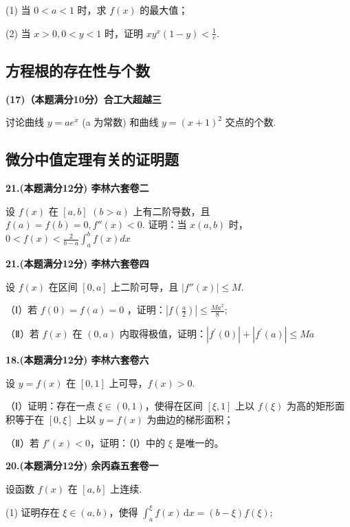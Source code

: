 \documentclass[a4paper,12pt]{article}
\begin{document}
(1) 当 $0 < a < 1$ 时，求 $f(x)$ 的最大值；

(2) 当 $x > 0, 0 < y < 1$ 时，证明 $xy^{x}(1 - y) < \frac{1}{e}$.

\subsection{方程根的存在性与个数}

\textbf{(17)（本题满分10分）合工大超越三}

讨论曲线 $y = a e^{x}$ (a 为常数) 和曲线 $y = (x + 1)^{2}$ 交点的个数.

\subsection{微分中值定理有关的证明题}

\textbf{21.(本题满分12分) 李林六套卷二}

设 $f(x)$ 在 $[a,b]$ $(b>a)$ 上有二阶导数，且 $f(a)=f(b)=0, f''(x)<0.$ 证明：当 $x(a,b)$ 时，$0<f(x)<\frac{2}{b-a}\int_{a}^{b}f(x)dx$

\vspace{0.5cm}

\textbf{21.(本题满分12分) 李林六套卷四}

设 $f(x)$ 在区间 $[0,a]$ 上二阶可导，且 $\left|f''(x)\right| \leqslant M.$

（Ⅰ）若 $f(0)=f(a)=0$ ，证明：$\left|f\left(\frac{a}{2}\right)\right|\leqslant\frac{Ma^{2}}{8}$;

（Ⅱ）若 $f(x)$ 在 $(0,a)$ 内取得极值，证明：$\left|f^{\prime}(0)\right|+\left|f^{\prime}(a)\right|\leqslant Ma$

\vspace{0.5cm}

\textbf{18.(本题满分12分) 李林六套卷六}

设 $y = f(x)$ 在 $[0,1]$ 上可导，$f(x) > 0$.

（Ⅰ）证明：存在一点 $\xi \in (0,1)$，使得在区间 $[\xi,1]$ 上以 $f(\xi)$ 为高的矩形面积等于在 $[0, \xi]$ 上以 $y = f(x)$ 为曲边的梯形面积；

（Ⅱ）若 $f'(x) < 0$，证明：（Ⅰ）中的 $\xi$ 是唯一的。

\vspace{0.5cm}

\textbf{20.(本题满分12分) 余丙森五套卷一}

设函数 $f(x)$ 在 $[a,b]$ 上连续.

(1) 证明存在 $\xi \in (a, b)$，使得 $\int_{a}^{\xi} f(x) \, \mathrm{d}x = (b - \xi) f(\xi)$;
\end{document}
